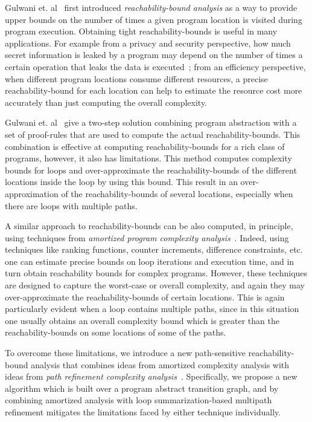
Gulwani et. al~\cite{GulwaniZ10} first introduced \emph{reachability-bound analysis} as a way to provide upper bounds on the number of times a given program location 
is visited during program execution.
Obtaining tight reachability-bounds is useful in many applications.
For example from a privacy and security perspective,
how much secret information is leaked by a program may depend on the number of times a certain operation that leaks the data
is executed~\cite{Malacaria07};
from an efficiency perspective, when different program locations consume different resources, a precise reachability-bound for each location can help to estimate the resource cost more accurately than just computing the overall complexity.

Gulwani et. al~\cite{GulwaniZ10}
give a two-step solution combining program abstraction with a set of proof-rules that are used to compute the actual reachability-bounds. This combination is effective at computing reachability-bounds for a rich class of programs, however, it also has limitations. This method 
computes complexity bounds for loops and over-approximate the reachability-bounds of the different locations inside the loop by using this bound. This result in an over-approximation of the reachability-bounds of several locations, especially when there are loops with multiple paths.

A similar approach to reachability-bounds can be also computed, in principle, using techniques from \emph{amortized program complexity analysis}~\cite{BradleyMS05,CookSZ13,Zuleger18,ZulegerGSV11,SinnZV14,SinnZV17,LuCT21,AliasDFG10}. Indeed, using techniques like ranking functions,  counter increments, difference constraints, etc.
one can estimate 
precise bounds on loop iterations and execution time, and in turn obtain reachability bounds for complex programs. However, these techniques are designed to capture the worst-case or overall complexity, and again they may over-approximate the reachability-bounds of certain locations. This is again particularly evident when a loop contains multiple paths, since in this situation one usually obtains an overall complexity bound which is greater than the reachability-bounds on some locations of some of the paths. 

To overcome these limitations, 
we introduce a new path-sensitive reachability-bound analysis that combines ideas from amortized complexity analysis with ideas from 
\emph{path refinement complexity analysis}~\cite{GustafssonEL05,ManoliosV06,BalakrishnanSIG09,SharmaDDA11,Flores-MontoyaH14,HumenbergerJK18,CyphertBKR19,GulwaniJK09,ZulegerGSV11}.
Specifically, we propose a new algorithm which is built over a program abstract transition graph, and by combining amortized  analysis with loop summarization-based multipath refinement mitigates the limitations faced by either technique individually. 
%

